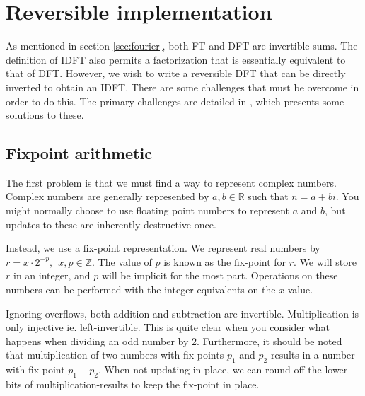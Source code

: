 \section{Reversible implementation}
As mentioned in section \ref{sec:fourier},
both FT and DFT are invertible sums.
The definition of IDFT also permits a factorization that is essentially equivalent to that of DFT.
However, we wish to write a reversible DFT that can be directly inverted to obtain an IDFT.
There are some challenges that must be overcome in order to do this.
The primary challenges are detailed in \cite{intfft},
which presents some solutions to these.

\subsection{Fixpoint arithmetic}
The first problem is that we must find a way to represent complex numbers.
Complex numbers are generally represented by $a, b \in \mathbb{R}$ such that $n = a + bi$.
You might normally choose to use floating point numbers to represent $a$ and $b$,
but updates to these are inherently destructive once.

Instead, we use a fix-point representation.
We represent real numbers by $r = x \cdot 2^{-p},~~ x, p \in \mathbb{Z}$.
The value of $p$ is known as the fix-point for $r$.
We will store $r$ in an integer, and $p$ will be implicit for the most part.
Operations on these numbers can be performed with the integer equivalents on the $x$ value.

Ignoring overflows, both addition and subtraction are invertible.
Multiplication is only injective ie. left-invertible.
This is quite clear when you consider what happens when dividing an odd number by 2.
Furthermore, it should be noted that multiplication of two numbers with fix-points $p_1$ and $p_2$
results in a number with fix-point $p_1 + p_2$.
When not updating in-place,
we can round off the lower bits of multiplication-results to keep the fix-point in place.

